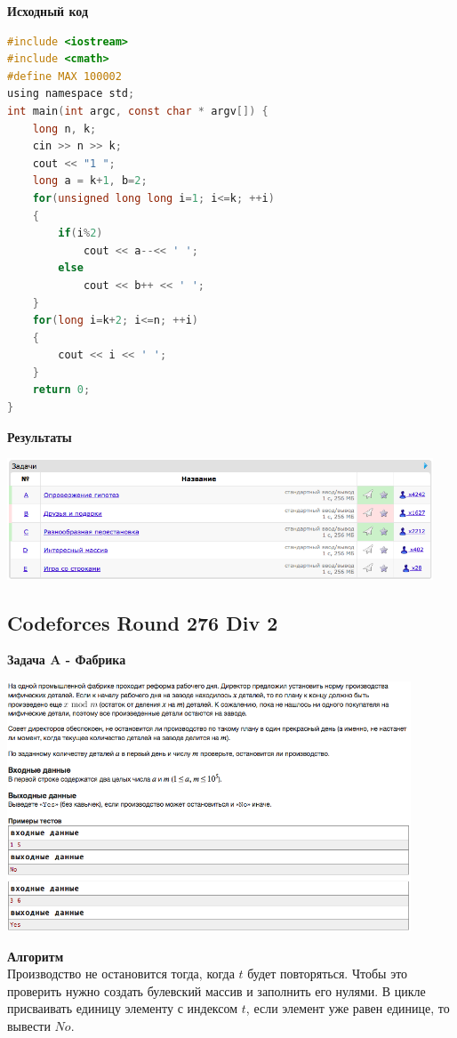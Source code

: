 \documentclass[a4paper,12pt]{article}
\begin{document}
\textbf{{\large Исходный код}}
\begin{lstlisting}[language=C]
#include <iostream>
#include <cmath>
#define MAX 100002
using namespace std;
int main(int argc, const char * argv[]) {
    long n, k;
    cin >> n >> k;
    cout << "1 ";
    long a = k+1, b=2;
    for(unsigned long long i=1; i<=k; ++i)
    {
        if(i%2)
            cout << a--<< ' ';
        else
            cout << b++ << ' ';
    }
    for(long i=k+2; i<=n; ++i)
    {
        cout << i << ' ';
    }
    return 0;
}
\end{lstlisting}

\textbf{{\large Результаты}} \\
\begin{center}
\includegraphics[width=0.95\textwidth]{C_275/A_C_275_result.png}\\ [1cm]
\end{center}


%
%

\newpage
\subsection{Codeforces Round 276 Div 2}

\textbf{{\large Задача A - Фабрика}} \\
\begin{center}
\includegraphics[width=0.9\textwidth]{C_276/C_276_A.png}\\ [1cm]
\end{center}
\textbf{{\large Алгоритм}} \\
Производство не остановится тогда, когда $t$ будет повторяться. Чтобы это проверить нужно создать булевский массив и заполнить его нулями. В цикле присваивать единицу элементу с индексом $t$, если элемент уже равен единице, то вывести $No$.\\
\end{document}
